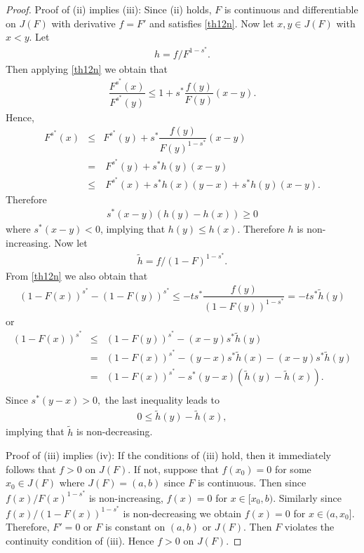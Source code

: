 \documentclass[11pt]{amsart}
\numberwithin{equation}{section}
\theoremstyle{definition}\newtheorem{definition}{Definition}
\theoremstyle{remark}\newtheorem{assumption}{Assumption}
\theoremstyle{remark}\newtheorem{remark}{Remark}
\theoremstyle{definition}\newtheorem{example}{Example}
\theoremstyle{plain}\newtheorem{question}{Question}
\theoremstyle{plain}\newtheorem{theorem}{Theorem}
\theoremstyle{plain}\newtheorem{lemma}{Lemma}
\theoremstyle{plain}\newtheorem{proposition}{Proposition}
\theoremstyle{plain}\newtheorem{corollary}{Corollary}
\theoremstyle{plain}\newtheorem{conjecture}{Conjecture}
\begin{document}
\begin{proof}
Proof of (ii) implies (iii):  
Since
    (ii) holds, $F$ is continuous and differentiable on $J(F)$ with derivative $f=F'$ and satisfies \eqref{th12n}. 
    Now let $x,y\in J(F)$ with $x<y.$  Let 
\begin{eqnarray}
    h=f/F^{1-s^*}.
    \label{defhsp}
\end{eqnarray} 
 Then applying \eqref{th12n} we obtain that
\begin{eqnarray*}
    \dfrac{F^{s^*}(x)}{F^{s^*}(y)}\leq 1+s^*\dfrac{f(y)}{F(y)}(x-y).
\end{eqnarray*}
    Hence, 
\begin{eqnarray*}
    F^{s^*}(x)
    & \leq & F^{s^*}(y)+s^*\dfrac{f(y)}{F(y)^{1-s^*}}(x-y)\\
    & = & \ F^{s^*}(y)+s^*h(y)(x-y)\\
    &\leq & \ F^{s^*}(x)+s^*h(x)(y-x)+s^*h(y)(x-y).
\end{eqnarray*}
    Therefore 
\begin{eqnarray*}
    s^{*}(x-y)(h(y)-h(x))\geq 0
\end{eqnarray*} 
    where $s^{*}(x-y)<0$,  implying that $h(y)\leq h(x)$. 
    Therefore $h$ is non-increasing. Now let 
\begin{eqnarray}
    \tilde{h}=f/(1-F)^{1-s^{*}}.
     \label{defthsp}
\end{eqnarray} 
From \eqref{th12n} we also obtain that 
\begin{eqnarray*}
    (1-F(x))^{s^{*}}-(1-F(y))^{s^*}\leq -ts^{*}\dfrac{f(y)}{(1-F(y))^{1-s^*}}=-ts^{*}\tilde{h}(y)
\end{eqnarray*}
    or
\begin{eqnarray*}
  (1-F(x))^{s^{*}}
  & \leq & (1-F(y))^{s^*}  -(x-y)s^{*}\tilde{h}(y)\\
  & = & (1-F(x))^{s^*}-(y-x)s^{*}\tilde{h}(x)  -(x-y)s^{*}\tilde{h}(y)\\
  & =  & (1-F(x))^{s^*}-s^{*}(y-x)(\tilde{h}(y)-\tilde{h}(x)).\\
\end{eqnarray*}
    Since $s^{*}(y-x)>0,$ the last inequality leads to
\begin{eqnarray*}
    0\leq \tilde{h}(y)-\tilde{h}(x), 
\end{eqnarray*}  
    implying that $\tilde{h}$ is non-decreasing. 

Proof of (iii) implies (iv):
   If the conditions of (iii) hold, then it immediately follows that $f>0$ on $J(F)$. 
    If not, suppose that $f(x_0) = 0$ for some $x_0\in J(F)$ where $J(F)=(a,b)$ since $F$ is continuous.
    Then since $f(x)/F(x)^{1-s^*}$ is non-increasing, 
    $f(x)=0$ for  $x\in[x_0,b)$. Similarly since $f(x)/(1-F(x))^{1-s^*}$ is non-decreasing 
    we obtain $f(x)=0$ for $x\in(a, x_0]$.
    Therefore, $F'=0$  or $F$ is constant on $(a,b)$ or $J(F)$. Then $F$ violates the continuity 
    condition of (iii). Hence $f>0$ on $J(F)$.  
   

\end{proof}
\end{document}
